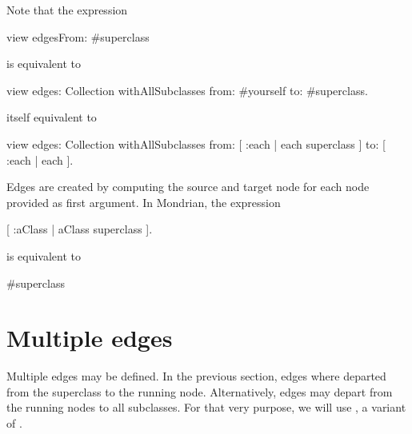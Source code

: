 \documentclass[a4paper,10pt,twoside]{book}
\begin{document}
Note that the expression 
\begin{code}{}
view edgesFrom: #superclass
\end{code}

is equivalent to

\begin{code}{}
view edges: Collection withAllSubclasses from: #yourself to: #superclass.
\end{code}

itself equivalent to
\begin{code}{}
view 
  edges: Collection withAllSubclasses 
  from: [ :each | each superclass ] 
  to: [ :each | each  ].
\end{code}

Edges are created by computing the source and target node for each node provided as first argument. In Mondrian, the expression

\begin{code}{}
[ :aClass | aClass superclass ].
\end{code}

is equivalent to
\begin{code}{}
#superclass
\end{code}

\section{Multiple edges}
Multiple edges may be defined. In the previous section, edges where departed from the superclass to the running node. Alternatively, edges may depart from the running nodes to all subclasses. For that very purpose, we will use , a variant of .
\end{document}
